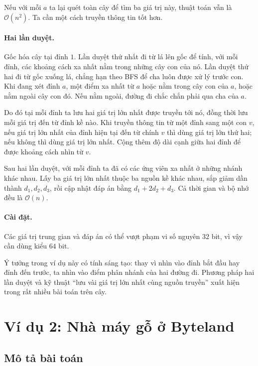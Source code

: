 \documentclass[11pt]{article}
\newcommand{\Oh}{\mathcal{O}}
\begin{document}
Nếu với mỗi \(a\) ta lại quét toàn cây để tìm ba giá trị này, thuật toán vẫn
là \(\Oh(n^2)\). Ta cần một cách truyền thông tin tốt hơn.

\paragraph{Hai lần duyệt.}
Gốc hóa cây tại đỉnh \(1\). Lần duyệt thứ nhất đi từ lá lên gốc để tính, với
mỗi đỉnh, các khoảng cách xa nhất nằm trong những cây con của nó. Lần duyệt
thứ hai đi từ gốc xuống lá, chẳng hạn theo BFS để cha luôn được xử lý trước
con. Khi đang xét đỉnh \(a\), một điểm xa nhất từ \(a\) hoặc nằm trong cây con
của \(a\), hoặc nằm ngoài cây con đó. Nếu nằm ngoài, đường đi chắc chắn phải
qua cha của \(a\).

Do đó tại mỗi đỉnh ta lưu hai giá trị lớn nhất được truyền tới nó, đồng thời
lưu mỗi giá trị đến từ đỉnh kề nào. Khi truyền thông tin từ một đỉnh sang một
con \(v\), nếu giá trị lớn nhất của đỉnh hiện tại đến từ chính \(v\) thì dùng
giá trị lớn thứ hai; nếu không thì dùng giá trị lớn nhất. Cộng thêm độ dài
cạnh giữa hai đỉnh để được khoảng cách nhìn từ \(v\).

Sau hai lần duyệt, với mỗi đỉnh ta đã có các ứng viên xa nhất ở những nhánh
khác nhau. Lấy ba giá trị lớn nhất thuộc ba nguồn kề khác nhau, sắp giảm dần
thành \(d_1,d_2,d_3\), rồi cập nhật đáp án bằng \(d_1+2d_2+d_3\). Cả thời gian
và bộ nhớ đều là \(\Oh(n)\).

\paragraph{Cài đặt.}
Các giá trị trung gian và đáp án có thể vượt phạm vi số nguyên \(32\) bit, vì
vậy cần dùng kiểu \(64\) bit.

Ý tưởng trong ví dụ này có tính sáng tạo: thay vì nhìn vào đỉnh bắt đầu hay
đỉnh đến trước, ta nhìn vào điểm phân nhánh của hai đường đi. Phương pháp hai
lần duyệt và kỹ thuật ``lưu vài giá trị lớn nhất cùng nguồn truyền'' xuất
hiện trong rất nhiều bài toán trên cây.

\section{Ví dụ 2: Nhà máy gỗ ở Byteland}

\subsection{Mô tả bài toán}
\end{document}
